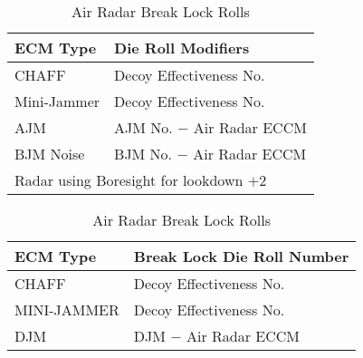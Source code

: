 \begin{table}
\centering
\caption{Air Radar Search and Lock-On Modifiers}
\medskip
\begin{tabular}{lp{15em}}
\hline
ECM Type & Die Roll Modifiers\\
\hline
CHAFF&Decoy Effectiveness No.\\
Mini-Jammer&Decoy Effectiveness No.\\
AJM&AJM No. $-$ Air Radar ECCM\\
BJM Noise&BJM No. $-$ Air Radar ECCM\\
\multicolumn{2}{l}{Radar using Boresight for lookdown $+2$}\\
\hline
\end{tabular}
\bigskip
\caption{Air Radar Break Lock Rolls}
\medskip
\begin{tabular}{lp{15em}}
\hline
ECM Type&Break Lock Die Roll Number\\
\hline
CHAFF&Decoy Effectiveness No.\\
MINI-JAMMER&Decoy Effectiveness No.\\
DJM&DJM $-$ Air Radar ECCM\\
\hline
\end{tabular}
\end{table}